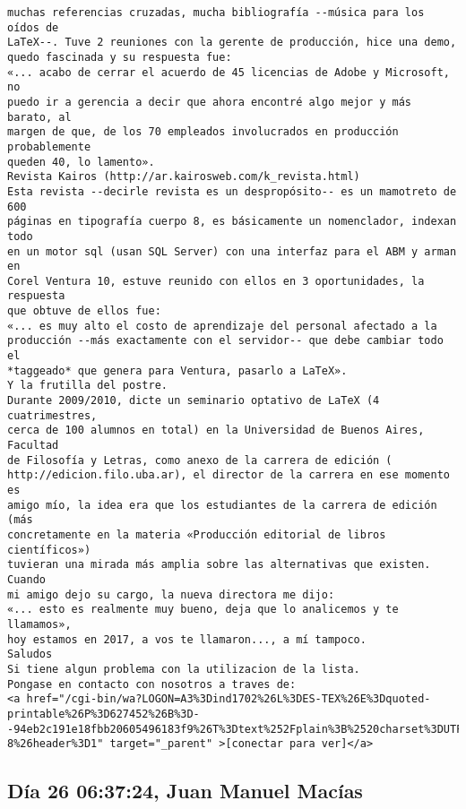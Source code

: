 \documentclass[a4paper,10pt]{article}
\begin{document}
\begin{lstlisting}
muchas referencias cruzadas, mucha bibliografía --música para los oídos de
LaTeX--. Tuve 2 reuniones con la gerente de producción, hice una demo,
quedo fascinada y su respuesta fue:
«... acabo de cerrar el acuerdo de 45 licencias de Adobe y Microsoft, no
puedo ir a gerencia a decir que ahora encontré algo mejor y más barato, al
margen de que, de los 70 empleados involucrados en producción probablemente
queden 40, lo lamento».
Revista Kairos (http://ar.kairosweb.com/k_revista.html)
Esta revista --decirle revista es un despropósito-- es un mamotreto de 600
páginas en tipografía cuerpo 8, es básicamente un nomenclador, indexan todo
en un motor sql (usan SQL Server) con una interfaz para el ABM y arman en
Corel Ventura 10, estuve reunido con ellos en 3 oportunidades, la respuesta
que obtuve de ellos fue:
«... es muy alto el costo de aprendizaje del personal afectado a la
producción --más exactamente con el servidor-- que debe cambiar todo el
*taggeado* que genera para Ventura, pasarlo a LaTeX».
Y la frutilla del postre.
Durante 2009/2010, dicte un seminario optativo de LaTeX (4 cuatrimestres,
cerca de 100 alumnos en total) en la Universidad de Buenos Aires, Facultad
de Filosofía y Letras, como anexo de la carrera de edición (
http://edicion.filo.uba.ar), el director de la carrera en ese momento es
amigo mío, la idea era que los estudiantes de la carrera de edición (más
concretamente en la materia «Producción editorial de libros científicos»)
tuvieran una mirada más amplia sobre las alternativas que existen. Cuando
mi amigo dejo su cargo, la nueva directora me dijo:
«... esto es realmente muy bueno, deja que lo analicemos y te llamamos»,
hoy estamos en 2017, a vos te llamaron..., a mí tampoco.
Saludos
Si tiene algun problema con la utilizacion de la lista.
Pongase en contacto con nosotros a traves de:
<a href="/cgi-bin/wa?LOGON=A3%3Dind1702%26L%3DES-TEX%26E%3Dquoted-printable%26P%3D627452%26B%3D--94eb2c191e18fbb20605496183f9%26T%3Dtext%252Fplain%3B%2520charset%3DUTF-8%26header%3D1" target="_parent" >[conectar para ver]</a>

\end{lstlisting}

\subsection{Día 26 06:37:24, Juan Manuel Macías}
\end{document}
